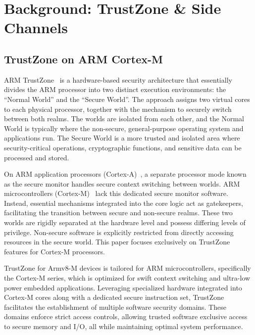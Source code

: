 \section{Background: TrustZone \& Side Channels} \label{sect:problem}

\subsection{TrustZone on ARM Cortex-M}

ARM TrustZone~\cite{DemystifyingAT, TZArchitecture} is a hardware-based
security architecture that essentially divides the ARM processor into two
distinct execution environments: the ``Normal World'' and the ``Secure
World''. The approach assigns two virtual cores to each physical processor,
together with the mechanism to securely switch between both realms. The
worlds are isolated from each other, and the Normal World is typically
where the non-secure, general-purpose operating system and applications
run. The Secure World is a more trusted and isolated area where
security-critical operations, cryptographic functions, and sensitive data
can be processed and stored.

On ARM application processors (Cortex-A)~\cite{TZA}, a separate processor
mode known as the secure monitor handles secure context switching between
worlds. ARM microcontrollers (Cortex-M)~\cite{TZM} lack this dedicated
secure monitor software. Instead, essential mechanisms integrated into the
core logic act as gatekeepers, facilitating the transition between secure
and non-secure realms. These two worlds are rigidly separated at the
hardware level and possess differing levels of privilege. Non-secure
software is explicitly restricted from directly accessing resources in the
secure world. This paper focuses exclusively on TrustZone features for
Cortex-M processors.

TrustZone for Armv8-M devices is tailored for ARM
microcontrollers, specifically the Cortex-M series, which is optimized for
swift context switching and ultra-low power embedded applications.
Leveraging specialized hardware integrated into Cortex-M cores along with a
dedicated secure instruction set, TrustZone facilitates the establishment
of multiple software security domains. These domains enforce strict access
controls, allowing trusted software exclusive access to secure memory and
I/O, all while maintaining optimal system performance.

